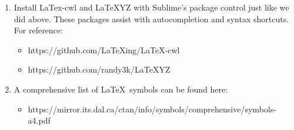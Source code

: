 \documentclass{article}
\begin{document}
\begin{enumerate}
\item Install LaTex-cwl and LaTeXYZ with Sublime's package control just like we did above. These packages assist with autocompletion and syntax shortcuts. For reference:
	\begin{itemize}
	\item https://github.com/LaTeXing/LaTeX-cwl
	\item https://github.com/randy3k/LaTeXYZ
	\end{itemize}

\item A comprehensive list of \LaTeX \ symbols can be found here:
	\begin{itemize}
	\item https://mirror.its.dal.ca/ctan/info/symbols/comprehensive/symbols-a4.pdf
	\end{itemize}
\end{enumerate}
\end{document}
